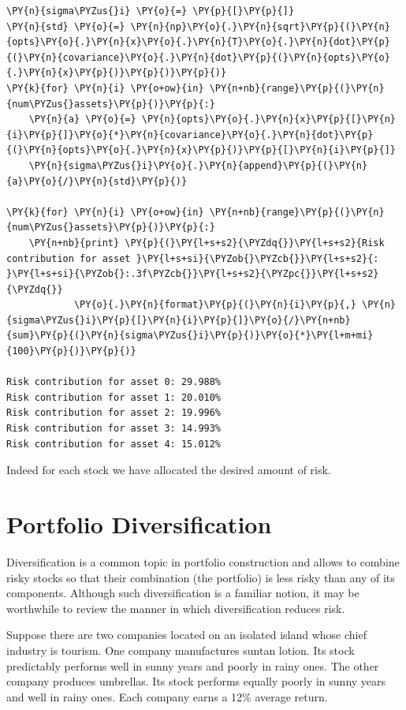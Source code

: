 \begin{codebox}
\begin{Verbatim}[commandchars=\\\{\}]
\PY{n}{sigma\PYZus{}i} \PY{o}{=} \PY{p}{[}\PY{p}{]}
\PY{n}{std} \PY{o}{=} \PY{n}{np}\PY{o}{.}\PY{n}{sqrt}\PY{p}{(}\PY{n}{opts}\PY{o}{.}\PY{n}{x}\PY{o}{.}\PY{n}{T}\PY{o}{.}\PY{n}{dot}\PY{p}{(}\PY{n}{covariance}\PY{o}{.}\PY{n}{dot}\PY{p}{(}\PY{n}{opts}\PY{o}{.}\PY{n}{x}\PY{p}{)}\PY{p}{)}\PY{p}{)} 
\PY{k}{for} \PY{n}{i} \PY{o+ow}{in} \PY{n+nb}{range}\PY{p}{(}\PY{n}{num\PYZus{}assets}\PY{p}{)}\PY{p}{:}
    \PY{n}{a} \PY{o}{=} \PY{n}{opts}\PY{o}{.}\PY{n}{x}\PY{p}{[}\PY{n}{i}\PY{p}{]}\PY{o}{*}\PY{n}{covariance}\PY{o}{.}\PY{n}{dot}\PY{p}{(}\PY{n}{opts}\PY{o}{.}\PY{n}{x}\PY{p}{)}\PY{p}{[}\PY{n}{i}\PY{p}{]} 
    \PY{n}{sigma\PYZus{}i}\PY{o}{.}\PY{n}{append}\PY{p}{(}\PY{n}{a}\PY{o}{/}\PY{n}{std}\PY{p}{)}
		
\PY{k}{for} \PY{n}{i} \PY{o+ow}{in} \PY{n+nb}{range}\PY{p}{(}\PY{n}{num\PYZus{}assets}\PY{p}{)}\PY{p}{:}
    \PY{n+nb}{print} \PY{p}{(}\PY{l+s+s2}{\PYZdq{}}\PY{l+s+s2}{Risk contribution for asset }\PY{l+s+si}{\PYZob{}\PYZcb{}}\PY{l+s+s2}{: }\PY{l+s+si}{\PYZob{}:.3f\PYZcb{}}\PY{l+s+s2}{\PYZpc{}}\PY{l+s+s2}{\PYZdq{}}
            \PY{o}{.}\PY{n}{format}\PY{p}{(}\PY{n}{i}\PY{p}{,} \PY{n}{sigma\PYZus{}i}\PY{p}{[}\PY{n}{i}\PY{p}{]}\PY{o}{/}\PY{n+nb}{sum}\PY{p}{(}\PY{n}{sigma\PYZus{}i}\PY{p}{)}\PY{o}{*}\PY{l+m+mi}{100}\PY{p}{)}\PY{p}{)}
		
Risk contribution for asset 0: 29.988%
Risk contribution for asset 1: 20.010%
Risk contribution for asset 2: 19.996%
Risk contribution for asset 3: 14.993%
Risk contribution for asset 4: 15.012%
\end{Verbatim}
\end{codebox}

Indeed for each stock we have allocated the desired amount of risk.

\section{Portfolio Diversification}

Diversification is a common topic in portfolio construction and allows to combine risky stocks so that their combination (the portfolio) is less risky than any of its components. Although such diversification is a familiar notion, it may be worthwhile to review the manner in which diversification reduces risk.

Suppose there are two companies located on an isolated island whose chief industry is tourism. One company manufactures suntan lotion. Its stock predictably performs well in sunny years and poorly in rainy ones. The other company produces umbrellas. Its stock performs equally poorly in sunny years and well in rainy ones. Each company earns a 12\% average return.

